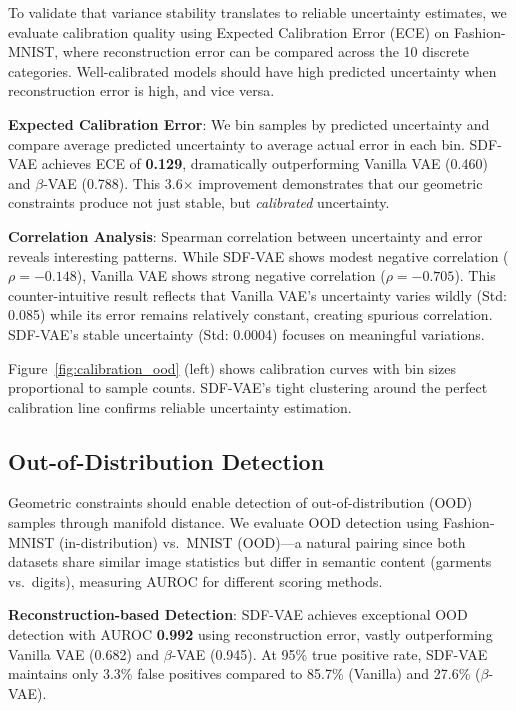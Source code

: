 \documentclass[10pt,twocolumn,letterpaper]{article}
\begin{document}
To validate that variance stability translates to reliable uncertainty estimates, we evaluate calibration quality using Expected Calibration Error (ECE) on Fashion-MNIST, where reconstruction error can be compared across the 10 discrete categories. Well-calibrated models should have high predicted uncertainty when reconstruction error is high, and vice versa.

\textbf{Expected Calibration Error}: We bin samples by predicted uncertainty and compare average predicted uncertainty to average actual error in each bin. SDF-VAE achieves ECE of \textbf{0.129}, dramatically outperforming Vanilla VAE (0.460) and $\beta$-VAE (0.788). This 3.6$\times$ improvement demonstrates that our geometric constraints produce not just stable, but \textit{calibrated} uncertainty.

\textbf{Correlation Analysis}: Spearman correlation between uncertainty and error reveals interesting patterns. While SDF-VAE shows modest negative correlation ($\rho=-0.148$), Vanilla VAE shows strong negative correlation ($\rho=-0.705$). This counter-intuitive result reflects that Vanilla VAE's uncertainty varies wildly (Std: 0.085) while its error remains relatively constant, creating spurious correlation. SDF-VAE's stable uncertainty (Std: 0.0004) focuses on meaningful variations.

Figure~\ref{fig:calibration_ood} (left) shows calibration curves with bin sizes proportional to sample counts. SDF-VAE's tight clustering around the perfect calibration line confirms reliable uncertainty estimation.

\subsection{Out-of-Distribution Detection}

Geometric constraints should enable detection of out-of-distribution (OOD) samples through manifold distance. We evaluate OOD detection using Fashion-MNIST (in-distribution) vs.\ MNIST (OOD)---a natural pairing since both datasets share similar image statistics but differ in semantic content (garments vs.\ digits), measuring AUROC for different scoring methods.

\textbf{Reconstruction-based Detection}: SDF-VAE achieves exceptional OOD detection with AUROC \textbf{0.992} using reconstruction error, vastly outperforming Vanilla VAE (0.682) and $\beta$-VAE (0.945). At 95\% true positive rate, SDF-VAE maintains only 3.3\% false positives compared to 85.7\% (Vanilla) and 27.6\% ($\beta$-VAE).
\end{document}

